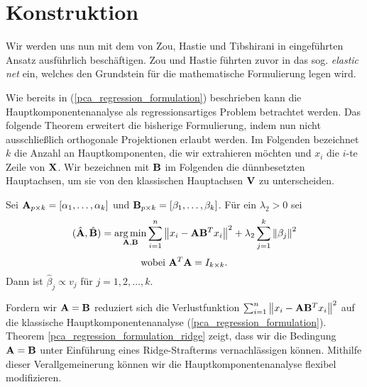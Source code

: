 

\section{Konstruktion}
\label{construction}

Wir werden uns nun mit dem von Zou, Hastie und Tibshirani in \cite{zou_sparsepca} eingeführten Ansatz ausführlich beschäftigen. Zou und Hastie führten zuvor in \cite{zou_elasticnet} das sog. \textit{elastic net} ein, welches den Grundstein für die mathematische Formulierung legen wird.

Wie bereits in (\ref{pca_regression_formulation}) beschrieben kann die Hauptkomponentenanalyse als regressionsartiges Problem betrachtet werden. Das folgende Theorem erweitert die bisherige Formulierung, indem nun nicht ausschließlich orthogonale Projektionen erlaubt werden. 
Im Folgenden bezeichnet $k$ die Anzahl an Hauptkomponenten, die wir extrahieren möchten und $x_i$ die $i$-te Zeile von $\mathbf{X}$. Wir bezeichnen mit $\mathbf{B}$ im Folgenden die dünnbesetzten Hauptachsen, um sie von den klassischen Hauptachsen $\mathbf{V}$ zu unterscheiden.

\begin{thm} \label{pca_regression_formulation_ridge}
Sei $\mathbf{A}_{p \times k} = [ \alpha_1, \ldots ,\alpha_k ]$ und $\mathbf{B}_{p \times k} = [ \beta_1, \ldots ,\beta_k ]$. Für ein $\lambda_2 > 0$ sei
$$(\hat{\mathbf{A}}, \hat{\mathbf{B}}) = \operatorname*{arg\,min}_{\mathbf{A}, \mathbf{B}} \sum_{i=1}^{n} \left\lVert x_i - \mathbf{A}\mathbf{B}^Tx_i \right\rVert^2 + \lambda_2 \sum_{j=1}^{k}\left\lVert \beta_j \right\rVert^2$$
$$\text{wobei } \mathbf{A}^T\mathbf{A} = I_{k \times k}.$$
Dann ist $\hat{\beta}_j \propto v_j$ für $j = 1,2,\ldots,k$. 
\end{thm}

Fordern wir $\mathbf{A} =  \mathbf{B}$ reduziert sich die Verlustfunktion $\sum_{i=1}^{n} \left\lVert x_i - \mathbf{A}\mathbf{B}^Tx_i \right\rVert^2$ auf die klassische Hauptkomponentenanalyse (\ref{pca_regression_formulation}). Theorem \ref{pca_regression_formulation_ridge} zeigt, dass wir die Bedingung $\mathbf{A} = \mathbf{B}$ unter Einführung eines Ridge-Strafterms vernachlässigen können. Mithilfe dieser Verallgemeinerung können wir die Hauptkomponentenanalyse flexibel modifizieren.

